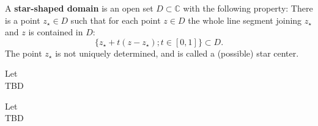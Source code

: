 \begin{definition}
    \label{sec:StarDomain}
    A \textbf{star-shaped domain} is an open set $D \subset \mathbb{C}$ with the following property:
    There is a point $z_\star \in D$ such that for each point $z \in D$ the whole line segment joining $z_\star$ and $z$ is
    contained in $D$:
    $$\{ z_\star + t(z - z_\star) ; t \in [0, 1] \} \subset D .$$
    The point $z_\star$ is not uniquely determined, and is called a (possible) star center.
\end{definition}


\begin{definition}
    \label{sec:ElemDomain}
    Let\\
    TBD
\end{definition}


\begin{definition}
    \label{sec:EntireFunction}
    Let\\
    TBD
\end{definition}